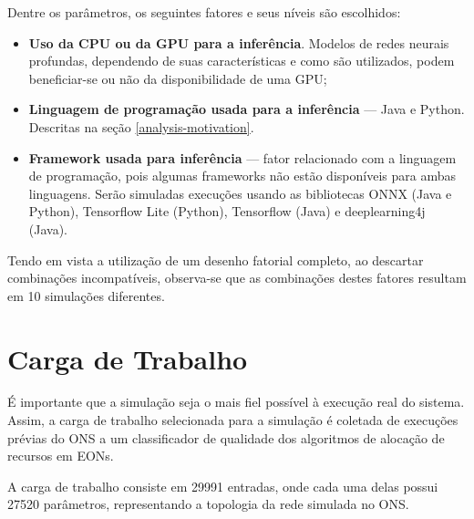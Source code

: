 Dentre os parâmetros, os seguintes fatores e seus níveis são escolhidos:

\begin{itemize}
  \item \textbf{Uso da CPU ou da GPU para a inferência}. Modelos de redes neurais profundas, dependendo de suas características e como são utilizados, podem beneficiar-se ou não da disponibilidade de uma GPU;
  \item \textbf{Linguagem de programação usada para a inferência} — Java e Python. Descritas na seção \ref{analysis-motivation}.
  \item \textbf{Framework usada para inferência} — fator relacionado com a linguagem de programação, pois algumas frameworks não estão disponíveis para ambas linguagens. Serão simuladas execuções usando as bibliotecas ONNX \cite{onnx2019} (Java e Python), Tensorflow Lite (Python), Tensorflow (Java) e deeplearning4j \cite{deeplearning4j} (Java).
\end{itemize}

Tendo em vista a utilização de um desenho fatorial completo, ao descartar combinações incompatíveis, observa-se que as combinações destes fatores resultam em 10 simulações diferentes.

\section{Carga de Trabalho}
\label{workload}

É importante que a simulação seja o mais fiel possível à execução real do sistema. Assim, a carga de trabalho selecionada para a simulação é coletada de execuções prévias do ONS a um classificador de qualidade dos algoritmos de alocação de recursos em EONs.

A carga de trabalho consiste em 29991 entradas, onde cada uma delas possui 27520 parâmetros, representando a topologia da rede simulada no ONS.
